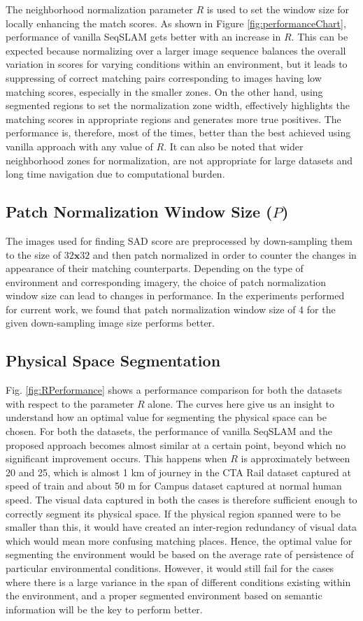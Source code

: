 \documentclass[letterpaper, 10 pt, conference]{ieeeconf}  %
\begin{document}
The neighborhood normalization parameter $R$ is used to set the window size for locally enhancing the match scores. As shown in Figure \ref{fig:performanceChart}, performance of vanilla SeqSLAM gets better with an increase in $R$. This can be expected because normalizing over a larger image sequence balances the overall variation in scores for varying conditions within an environment, but it leads to suppressing of correct matching pairs corresponding to images having low matching scores, especially in the smaller zones. On the other hand, using segmented regions to set the normalization zone width, effectively highlights the matching scores in appropriate regions and generates more true positives. The performance is, therefore, most of the times, better than the best achieved using vanilla approach with any value of $R$. It can also be noted that wider neighborhood zones for normalization, are not appropriate for large datasets and long time navigation due to computational burden. 

\subsection{Patch Normalization Window Size ($P$)}
The images used for finding SAD score are preprocessed by down-sampling them to the size of $32\mathbf{x}32$ and then patch normalized in order to counter the changes in appearance of their matching counterparts. Depending on the type of environment and corresponding imagery, the choice of patch normalization window size can lead to changes in performance. In the experiments performed for current work, we found that patch normalization window size of 4 for the given down-sampling image size performs better.

\subsection{Physical Space Segmentation}
Fig. \ref{fig:RPerformance} shows a performance comparison for both the datasets with respect to the parameter $R$ alone. The curves here give us an insight to understand how an optimal value for segmenting the physical space can be chosen. For both the datasets, the performance of vanilla SeqSLAM and the proposed approach becomes almost similar at a certain point, beyond which no significant improvement occurs. This happens when $R$ is approximately between 20 and 25, which is almost 1 km of journey in the CTA Rail dataset captured at speed of train and about 50 m for Campus dataset captured at normal human speed. The visual data captured in both the cases is therefore sufficient enough to correctly segment its physical space. If the physical region spanned were to be smaller than this, it would have created an inter-region redundancy of visual data which would mean more confusing matching places. Hence, the optimal value for segmenting the environment would be based on the average rate of persistence of particular environmental conditions. However, it would still fail for the cases where there is a large variance in the span of different conditions existing within the environment, and a proper segmented environment based on semantic information will be the key to perform better.
\end{document}
